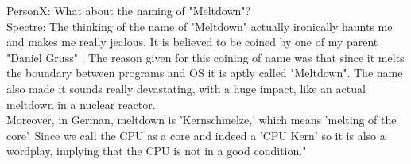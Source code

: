 \documentclass[12pt]{article}
\begin{document}
\begin{appendices}
	PersonX: What about the naming of "Meltdown"?\\
	
	Spectre: The thinking of the name of "Meltdown" actually ironically haunts me and makes me really jealous. It is believed to be coined by one of my parent "Daniel Gruss" . The reason given for this coining of name was that since it melts the boundary between programs and OS it is aptly called "Meltdown". The name also made it sounds really devastating, with a huge impact, like an actual meltdown in a nuclear reactor.\\
	Moreover, in German, meltdown is 'Kernschmelze,' which means 'melting of the core'. Since we call the CPU as a core and indeed a 'CPU Kern' so it is also a wordplay, implying that the CPU is not in a good condition."
	
\end{appendices}
\end{document}
